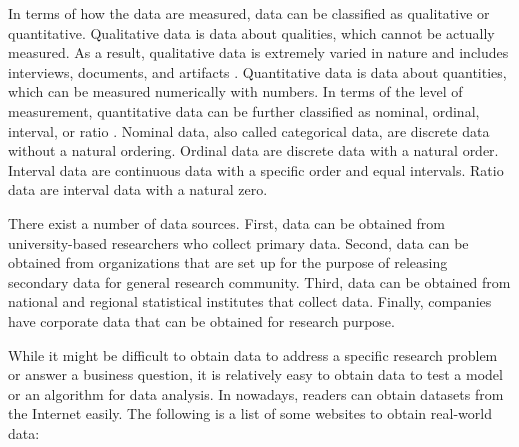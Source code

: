 \documentclass[]{book}
\theoremstyle{definition}
\theoremstyle{definition}
\theoremstyle{definition}
\theoremstyle{remark}
\begin{document}
In terms of how the data are measured, data can be classified as
qualitative or quantitative. Qualitative data is data about qualities,
which cannot be actually measured. As a result, qualitative data is
extremely varied in nature and includes interviews, documents, and
artifacts \citep{miles2014}. Quantitative data is data about quantities,
which can be measured numerically with numbers. In terms of the level of
measurement, quantitative data can be further classified as nominal,
ordinal, interval, or ratio \citep{gan2011}. Nominal data, also called
categorical data, are discrete data without a natural ordering. Ordinal
data are discrete data with a natural order. Interval data are
continuous data with a specific order and equal intervals. Ratio data
are interval data with a natural zero.

There exist a number of data sources. First, data can be obtained from
university-based researchers who collect primary data. Second, data can
be obtained from organizations that are set up for the purpose of
releasing secondary data for general research community. Third, data can
be obtained from national and regional statistical institutes that
collect data. Finally, companies have corporate data that can be
obtained for research purpose.

While it might be difficult to obtain data to address a specific
research problem or answer a business question, it is relatively easy to
obtain data to test a model or an algorithm for data analysis. In
nowadays, readers can obtain datasets from the Internet easily. The
following is a list of some websites to obtain real-world data:
\end{document}
